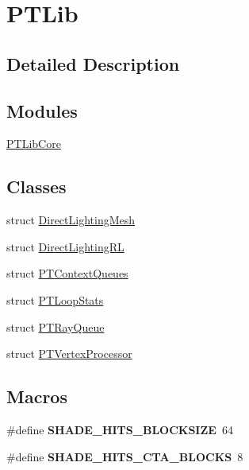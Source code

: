 \hypertarget{group___p_t_lib}{}\section{P\+T\+Lib}
\label{group___p_t_lib}


\subsection{Detailed Description}
\subsection*{Modules}
\begin{DoxyCompactItemize}
\item 
\hyperlink{group___p_t_lib_core}{P\+T\+Lib\+Core}
\end{DoxyCompactItemize}
\subsection*{Classes}
\begin{DoxyCompactItemize}
\item 
struct \hyperlink{struct_direct_lighting_mesh}{Direct\+Lighting\+Mesh}
\item 
struct \hyperlink{struct_direct_lighting_r_l}{Direct\+Lighting\+RL}
\item 
struct \hyperlink{struct_p_t_context_queues}{P\+T\+Context\+Queues}
\item 
struct \hyperlink{struct_p_t_loop_stats}{P\+T\+Loop\+Stats}
\item 
struct \hyperlink{struct_p_t_ray_queue}{P\+T\+Ray\+Queue}
\item 
struct \hyperlink{struct_p_t_vertex_processor}{P\+T\+Vertex\+Processor}
\end{DoxyCompactItemize}
\subsection*{Macros}
\begin{DoxyCompactItemize}
\item 
\mbox{\label{group___p_t_lib_ga755b56efd2e259b632bc0ec8eda852ee}} 
\#define {\bfseries S\+H\+A\+D\+E\+\_\+\+H\+I\+T\+S\+\_\+\+B\+L\+O\+C\+K\+S\+I\+ZE}~64
\item 
\mbox{\label{group___p_t_lib_ga6f11598b27b1c1ec5a95264319c357f9}} 
\#define {\bfseries S\+H\+A\+D\+E\+\_\+\+H\+I\+T\+S\+\_\+\+C\+T\+A\+\_\+\+B\+L\+O\+C\+KS}~8
\end{DoxyCompactItemize}
